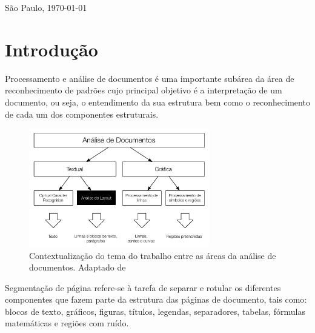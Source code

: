 \documentclass[a4paper,11pt]{article}
\begin{document}

\bigskip
\begin{center}
São Paulo, \today
\end{center}



\newpage
\setcounter{page}{1}



\section{Introdução}

Processamento e análise de documentos é uma importante subárea da área
de reconhecimento de padrões cujo principal objetivo é a
interpretação de um documento, ou seja, o entendimento
da sua estrutura bem como o reconhecimento de cada um dos
componentes estruturais.

\begin{figure}[htb]
\begin{center}
\includegraphics[width=0.7\textwidth]{assets/document_processing_areas_hierarquies.pdf}
\end{center}
\caption{Contextualização do tema do trabalho entre as áreas da
  análise de documentos. Adaptado de~\cite{Kasturi_OGorman_Govindaraju_2002}}
\label{fig:context1}
\end{figure}

Segmentação de página refere-se à tarefa de separar e rotular os diferentes
componentes que fazem parte da estrutura das páginas de
documento, tais como: blocos de texto, gráficos, figuras, títulos,
legendas, separadores, tabelas, fórmulas matemáticas e regiões com
ruído.
\end{document}

